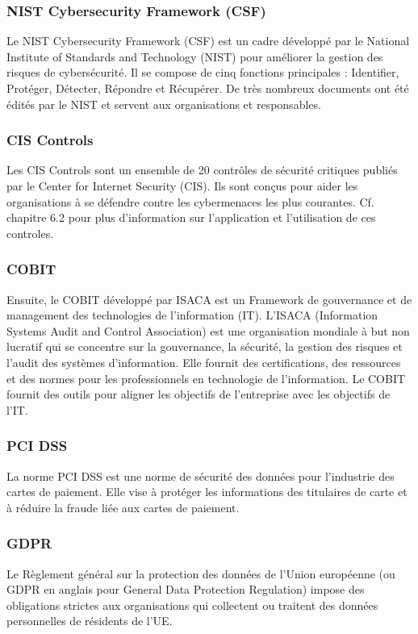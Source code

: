 \subsubsection{NIST Cybersecurity Framework (CSF)}
Le NIST Cybersecurity Framework (CSF) est un cadre développé par le National Institute of Standards and Technology (NIST) pour améliorer la gestion des risques de cybersécurité. Il se compose de cinq fonctions principales : Identifier, Protéger, Détecter, Répondre et Récupérer. De très nombreux documents ont été édités par le NIST et servent aux organisations et responsables.
	
\subsubsection{CIS Controls}
Les CIS Controls sont un ensemble de 20 contrôles de sécurité critiques publiés par le Center for Internet Security (CIS). Ils sont conçus pour aider les organisations à se défendre contre les cybermenaces les plus courantes. Cf. chapitre 6.2 pour plus d'information sur l'application et l'utilisation de ces controles.
	
\subsubsection{COBIT}
Ensuite, le COBIT développé par ISACA est un Framework de gouvernance et de management des technologies de l'information (IT). L'ISACA (Information Systems Audit and Control Association) est une organisation mondiale à but non lucratif qui se concentre sur la gouvernance, la sécurité, la gestion des risques et l'audit des systèmes d'information. Elle fournit des certifications, des ressources et des normes pour les professionnels en technologie de l'information. Le COBIT fournit des outils pour aligner les objectifs de l'entreprise avec les objectifs de l'IT.
	
\subsubsection{PCI DSS}
La norme PCI DSS est une norme de sécurité des données pour l'industrie des cartes de paiement. Elle vise à protéger les informations des titulaires de carte et à réduire la fraude liée aux cartes de paiement.
	
\subsubsection{GDPR}
Le Règlement général sur la protection des données de l'Union européenne (ou GDPR en anglais pour General Data Protection Regulation) impose des obligations strictes aux organisations qui collectent ou traitent des données personnelles de résidents de l'UE.
	
